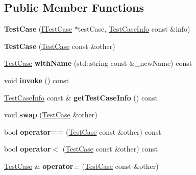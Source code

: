 \subsection*{Public Member Functions}
\begin{DoxyCompactItemize}
\item 
\hypertarget{class_catch_1_1_test_case_a03a5b913484681bd6d398dc5e9c2a907}{{\bfseries Test\-Case} (\hyperlink{struct_catch_1_1_i_test_case}{I\-Test\-Case} $\ast$test\-Case, \hyperlink{struct_catch_1_1_test_case_info}{Test\-Case\-Info} const \&info)}\label{class_catch_1_1_test_case_a03a5b913484681bd6d398dc5e9c2a907}

\item 
\hypertarget{class_catch_1_1_test_case_ac0011d3789edc3e44edb41f13c4775a0}{{\bfseries Test\-Case} (\hyperlink{class_catch_1_1_test_case}{Test\-Case} const \&other)}\label{class_catch_1_1_test_case_ac0011d3789edc3e44edb41f13c4775a0}

\item 
\hypertarget{class_catch_1_1_test_case_ab6dbc6c82b7c1680013c67bdedccfc8e}{\hyperlink{class_catch_1_1_test_case}{Test\-Case} {\bfseries with\-Name} (std\-::string const \&\-\_\-new\-Name) const }\label{class_catch_1_1_test_case_ab6dbc6c82b7c1680013c67bdedccfc8e}

\item 
\hypertarget{class_catch_1_1_test_case_aac2e028135cc88c3e3aac04650960a6c}{void {\bfseries invoke} () const }\label{class_catch_1_1_test_case_aac2e028135cc88c3e3aac04650960a6c}

\item 
\hypertarget{class_catch_1_1_test_case_a25c03661ab092431cdff10df5c58a5a7}{\hyperlink{struct_catch_1_1_test_case_info}{Test\-Case\-Info} const \& {\bfseries get\-Test\-Case\-Info} () const }\label{class_catch_1_1_test_case_a25c03661ab092431cdff10df5c58a5a7}

\item 
\hypertarget{class_catch_1_1_test_case_aee38f908faf10b905b209ca388275413}{void {\bfseries swap} (\hyperlink{class_catch_1_1_test_case}{Test\-Case} \&other)}\label{class_catch_1_1_test_case_aee38f908faf10b905b209ca388275413}

\item 
\hypertarget{class_catch_1_1_test_case_a40eab521b316c7d476f6b4dd1c33eec8}{bool {\bfseries operator==} (\hyperlink{class_catch_1_1_test_case}{Test\-Case} const \&other) const }\label{class_catch_1_1_test_case_a40eab521b316c7d476f6b4dd1c33eec8}

\item 
\hypertarget{class_catch_1_1_test_case_aa5174e85e3aac6e7398dee9c76730324}{bool {\bfseries operator$<$} (\hyperlink{class_catch_1_1_test_case}{Test\-Case} const \&other) const }\label{class_catch_1_1_test_case_aa5174e85e3aac6e7398dee9c76730324}

\item 
\hypertarget{class_catch_1_1_test_case_a8022e3f74232f7887d2d2cbbc8876502}{\hyperlink{class_catch_1_1_test_case}{Test\-Case} \& {\bfseries operator=} (\hyperlink{class_catch_1_1_test_case}{Test\-Case} const \&other)}\label{class_catch_1_1_test_case_a8022e3f74232f7887d2d2cbbc8876502}

\end{DoxyCompactItemize}
